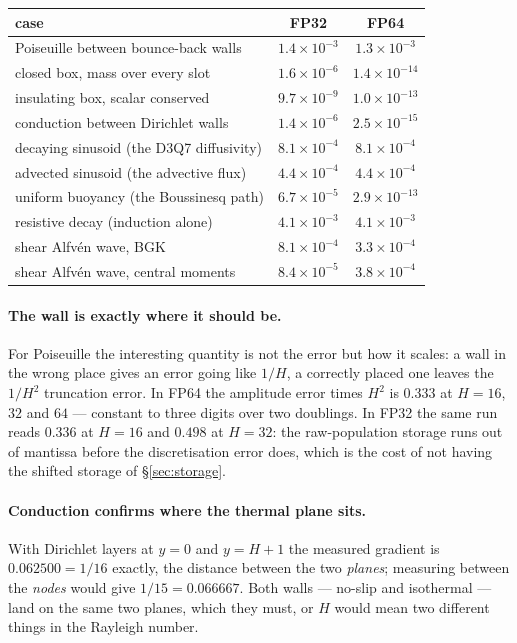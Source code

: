 \documentclass[11pt,a4paper]{article}
\newcommand{\e}[1]{\times 10^{#1}}
\begin{document}
\begin{center}\small
\begin{tabular}{lcc}
\toprule
case & FP32 & FP64 \\
\midrule
Poiseuille between bounce-back walls      & $1.4\e{-3}$ & $1.3\e{-3}$ \\
closed box, mass over every slot          & $1.6\e{-6}$ & $1.4\e{-14}$ \\
insulating box, scalar conserved          & $9.7\e{-9}$ & $1.0\e{-13}$ \\
conduction between Dirichlet walls        & $1.4\e{-6}$ & $2.5\e{-15}$ \\
decaying sinusoid (the D3Q7 diffusivity)  & $8.1\e{-4}$ & $8.1\e{-4}$ \\
advected sinusoid (the advective flux)    & $4.4\e{-4}$ & $4.4\e{-4}$ \\
uniform buoyancy (the Boussinesq path)    & $6.7\e{-5}$ & $2.9\e{-13}$ \\
resistive decay (induction alone)         & $4.1\e{-3}$ & $4.1\e{-3}$ \\
shear Alfv\'en wave, BGK                  & $8.1\e{-4}$ & $3.3\e{-4}$ \\
shear Alfv\'en wave, central moments      & $8.4\e{-5}$ & $3.8\e{-4}$ \\
\bottomrule
\end{tabular}
\end{center}

\paragraph{The wall is exactly where it should be.} For Poiseuille the
interesting quantity is not the error but how it scales: a wall in the wrong
place gives an error going like $1/H$, a correctly placed one leaves the $1/H^2$
truncation error. In FP64 the amplitude error times $H^2$ is $0.333$ at $H=16$,
$32$ and $64$ --- constant to three digits over two doublings. In FP32 the same
run reads $0.336$ at $H=16$ and $0.498$ at $H=32$: the raw-population storage
runs out of mantissa before the discretisation error does, which is the cost of
not having the shifted storage of \S\ref{sec:storage}.

\paragraph{Conduction confirms where the thermal plane sits.} With Dirichlet
layers at $y=0$ and $y=H+1$ the measured gradient is $0.062500 = 1/16$ exactly,
the distance between the two \emph{planes}; measuring between the \emph{nodes}
would give $1/15 = 0.066667$. Both walls --- no-slip and isothermal --- land on
the same two planes, which they must, or $H$ would mean two different things in
the Rayleigh number.
\end{document}
